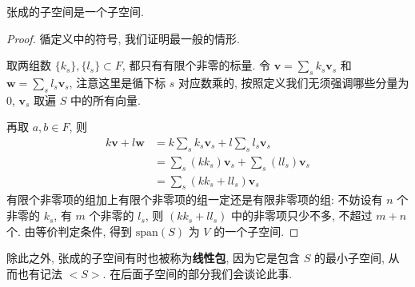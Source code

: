\documentclass[UTF8]{book}
\begin{document}
\begin{proposition}
    张成的子空间是一个子空间. 
\end{proposition}
\begin{proof}
    循定义中的符号, 我们证明最一般的情形. 

    取两组数 $\{k_s\},\{l_s\}\subset F$, 都只有有限个非零的标量. 
    令 $\boldsymbol{v} = \sum_{s}k_s \boldsymbol{v}_s$ 和 
    $\boldsymbol{w} = \sum_{s}l_s \boldsymbol{v}_s$, 
    注意这里是循下标 $s$ 对应数乘的, 按照定义我们无须强调哪些分量为 0, 
    $\boldsymbol{v}_s$ 取遍 $S$ 中的所有向量. 

    再取 $a,b \in F$, 则 
    $$ \begin{aligned}
    k\boldsymbol{v}+l\boldsymbol{w}
    &= k \sum_{s}k_s \boldsymbol{v}_s + l \sum_{s}l_s \boldsymbol{v}_s \\
    &= \sum_{s}(kk_s) \boldsymbol{v}_s + \sum_{s}(ll_s) \boldsymbol{v}_s \\
    &= \sum_{s} (kk_s+ll_s)\boldsymbol{v}_s
    \end{aligned}$$
    有限个非零项的组加上有限个非零项的组一定还是有限非零项的组: 
    不妨设有 $n$ 个非零的 $k_s$, 有 $m$ 个非零的 $l_s$, 
    则 $(kk_s+ll_s)$ 中的非零项只少不多, 不超过 $m+n$ 个. 
    由等价判定条件, 得到 $\mathrm{span}(S)$ 为 $V$ 的一个子空间.
\end{proof}

除此之外, 张成的子空间有时也被称为\textbf{线性包}, 
因为它是包含 $S$ 的最小子空间, 从而也有记法 $<S>$. 
在后面子空间的部分我们会谈论此事. 
\end{document}
